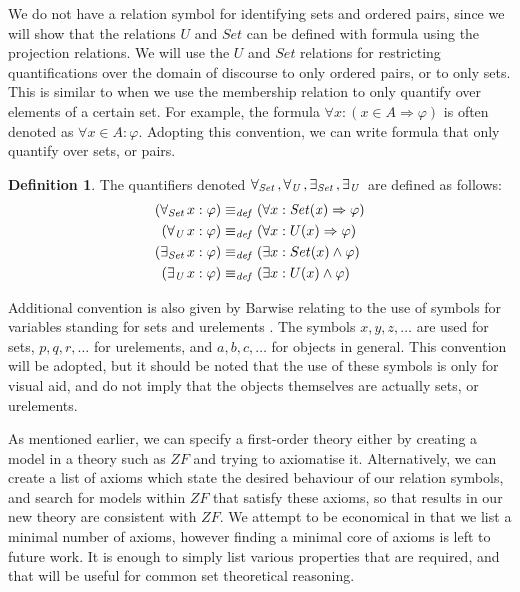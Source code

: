 \documentclass[11pt]{report}
\newcommand{\all}[1]{\forall_{\mathit{#1}}\hspace{0.5mm}}
\newcommand{\ex}[1]{\exists_{\mathit{#1}}\hspace{0.5mm}}
\newcommand{\eqdef}{\equiv_\mathit{def}}
\theoremstyle{definition}
\theoremstyle{theorem}
\theoremstyle{lemma}
\newtheorem{definition}{Definition}[section]
\begin{document}
We do not have a relation symbol for identifying sets and ordered pairs, since we will show that the relations $U$ and $\mathit{Set}$ can be defined with formula using the projection relations.
We will use the $\mathit{U}$ and $\mathit{Set}$ relations for restricting quantifications over the domain of discourse to only ordered pairs, or to only sets.
This is similar to when we use the membership relation to only quantify over elements of a certain set.
For example, the formula $\forall x: (x\in A \Rightarrow \varphi)$ is often denoted as $\forall x\in A: \varphi$.
Adopting this convention, we can write formula that only quantify over sets, or pairs.
\begin{definition}
The quantifiers denoted $\all{Set}, \all{U}, \ex{Set}, \ex{U}$ are defined as follows:
\begin{align*}
  (\all{Set} x: \varphi) &\eqdef (\forall x: \mathit{Set(x)} \Rightarrow \varphi)\\
  (\all{U} x: \varphi) &\eqdef (\forall x: U(x) \Rightarrow \varphi)\\
  (\ex{Set} x: \varphi) &\eqdef (\exists x: Set(x) \wedge \varphi)\\
  (\ex{U} x: \varphi) &\eqdef (\exists x: U(x) \wedge \varphi)
\end{align*}
\end{definition}
\noindent
Additional convention is also given by Barwise relating to the use of symbols for variables standing for sets and urelements \cite{barwise}.
The symbols $x,y,z,\ldots$ are used for sets, $p,q,r,\ldots$ for urelements, and $a,b,c,\ldots$ for objects in general.
This convention will be adopted, but it should be noted that the use of these symbols is only for visual aid, and do not imply that the objects themselves are actually sets, or urelements.

As mentioned earlier, we can specify a first-order theory either by creating a model in a theory such as $\mathit{ZF}$ and trying to axiomatise it.
Alternatively, we can create a list of axioms which state the desired behaviour of our relation symbols, and search for models within $\mathit{ZF}$ that satisfy these axioms, so that results in our new theory are consistent with $\mathit{ZF}$.
We attempt to be economical in that we list a minimal number of axioms, however finding a minimal core of axioms is left to future work.
It is enough to simply list various properties that are required, and that will be useful for common set theoretical reasoning. 
\end{document}
